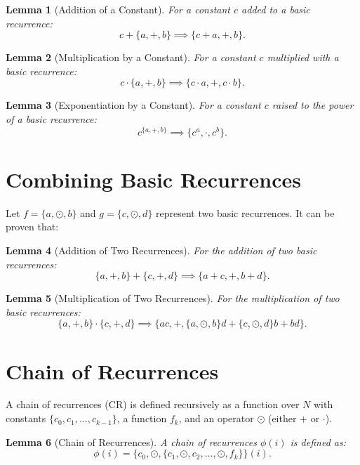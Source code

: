 \documentclass{article}
\newtheorem{lemma}{Lemma}
\begin{document}
    \begin{lemma}[Addition of a Constant]
    For a constant $c$ added to a basic recurrence:
    \[
    c + \{a, +, b\} \implies \{c + a, +, b\}.
    \]
    \end{lemma}
    
    \begin{lemma}[Multiplication by a Constant]
    For a constant $c$ multiplied with a basic recurrence:
    \[
    c \cdot \{a, +, b\} \implies \{c \cdot a, +, c \cdot b\}.
    \]
    \end{lemma}
    
    \begin{lemma}[Exponentiation by a Constant]
    For a constant $c$ raised to the power of a basic recurrence:
    \[
    c^{\{a, +, b\}} \implies \{c^a, \cdot, c^b\}.
    \]
    \end{lemma}
    
    \section*{Combining Basic Recurrences}
    
    Let $f = \{a, \odot, b\}$ and $g = \{c, \odot, d\}$ represent two basic recurrences. It can be proven that:
    
    \begin{lemma}[Addition of Two Recurrences]
    For the addition of two basic recurrences:
    \[
    \{a, +, b\} + \{c, +, d\} \implies \{a + c, +, b + d\}.
    \]
    \end{lemma}
    
    \begin{lemma}[Multiplication of Two Recurrences]
    For the multiplication of two basic recurrences:
    \[
    \{a, +, b\} \cdot \{c, +, d\} \implies \{ac, +, \{a, \odot, b\}d + \{c, \odot, d\}b + bd\}.
    \]
    \end{lemma}
    
    \section*{Chain of Recurrences}    
    A chain of recurrences (CR) is defined recursively as a function over $N$ with
     constants $\{c_0, c_1, \dots, c_{k-1}\}$, a function $f_k$, and an operator $\odot$ (either $+$ or $\cdot$). 
    
    \begin{lemma}[Chain of Recurrences]
    A chain of recurrences $\phi(i)$ is defined as:
    \[
    \phi(i) = \{c_0, \odot, \{c_1, \odot, c_2, \dots, \odot, f_k\}\}(i).
    \]
    \end{lemma}
    
\end{document}
